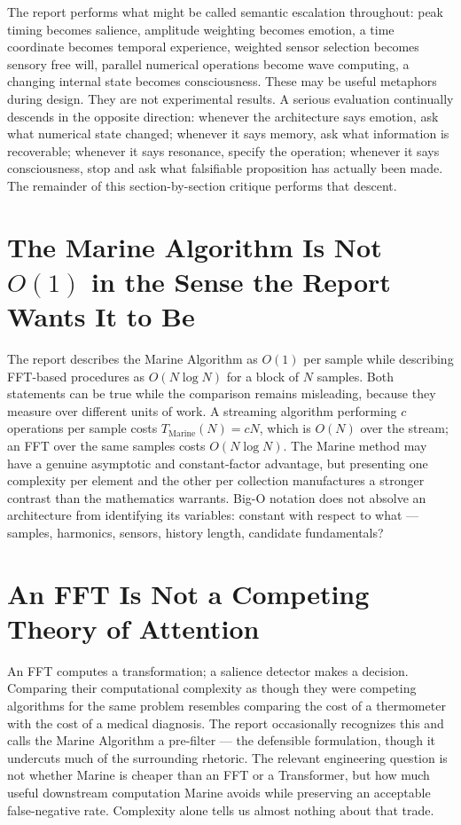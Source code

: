 \documentclass[12pt]{article}
\begin{document}
The report performs what might be called semantic escalation throughout: peak timing becomes salience, amplitude weighting becomes emotion, a time coordinate becomes temporal experience, weighted sensor selection becomes sensory free will, parallel numerical operations become wave computing, a changing internal state becomes consciousness. These may be useful metaphors during design. They are not experimental results. A serious evaluation continually descends in the opposite direction: whenever the architecture says emotion, ask what numerical state changed; whenever it says memory, ask what information is recoverable; whenever it says resonance, specify the operation; whenever it says consciousness, stop and ask what falsifiable proposition has actually been made. The remainder of this section-by-section critique performs that descent.

\section{The Marine Algorithm Is Not $O(1)$ in the Sense the Report Wants It to Be}

The report describes the Marine Algorithm as $O(1)$ per sample while describing FFT-based procedures as $O(N\log N)$ for a block of $N$ samples. Both statements can be true while the comparison remains misleading, because they measure over different units of work. A streaming algorithm performing $c$ operations per sample costs $T_{\mathrm{Marine}}(N)=cN$, which is $O(N)$ over the stream; an FFT over the same samples costs $O(N\log N)$. The Marine method may have a genuine asymptotic and constant-factor advantage, but presenting one complexity per element and the other per collection manufactures a stronger contrast than the mathematics warrants. Big-O notation does not absolve an architecture from identifying its variables: constant with respect to what — samples, harmonics, sensors, history length, candidate fundamentals?

\section{An FFT Is Not a Competing Theory of Attention}

An FFT computes a transformation; a salience detector makes a decision. Comparing their computational complexity as though they were competing algorithms for the same problem resembles comparing the cost of a thermometer with the cost of a medical diagnosis. The report occasionally recognizes this and calls the Marine Algorithm a pre-filter — the defensible formulation, though it undercuts much of the surrounding rhetoric. The relevant engineering question is not whether Marine is cheaper than an FFT or a Transformer, but how much useful downstream computation Marine avoids while preserving an acceptable false-negative rate. Complexity alone tells us almost nothing about that trade.
\end{document}
